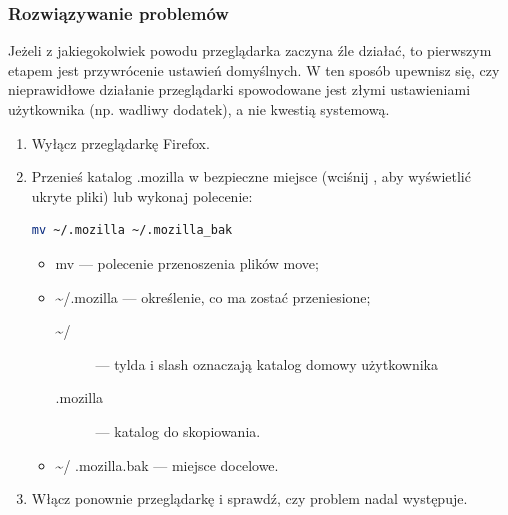 \subsubsection{Rozwiązywanie problemów}
Jeżeli z jakiegokolwiek powodu przeglądarka zaczyna źle działać, to pierwszym etapem jest przywrócenie ustawień domyślnych. W ten sposób upewnisz się, czy nieprawidłowe działanie przeglądarki spowodowane jest złymi ustawieniami użytkownika (np. wadliwy dodatek), a nie kwestią systemową.
\begin{enumerate}
\item Wyłącz przeglądarkę Firefox.
\item Przenieś katalog .mozilla w bezpieczne miejsce (wciśnij , aby wyświetlić ukryte pliki) lub wykonaj polecenie:
\begin{lstlisting}[language=bash]
mv ~/.mozilla ~/.mozilla_bak
\end{lstlisting}
\begin{itemize}
\item \textcolor{ubuntu_orange}{mv} --- polecenie przenoszenia plików move;
\item \textcolor{ubuntu_orange}{\textasciitilde /.mozilla} --- określenie, co ma zostać przeniesione;
	\begin{description}
	\item[\textasciitilde /] --- tylda i slash oznaczają katalog domowy użytkownika
	\item[.mozilla] --- katalog do skopiowania.
	\end{description}
\item \textasciitilde / .mozilla.bak --- miejsce docelowe.
\end{itemize}
\item Włącz ponownie przeglądarkę i sprawdź, czy problem nadal występuje.
\end{enumerate}
